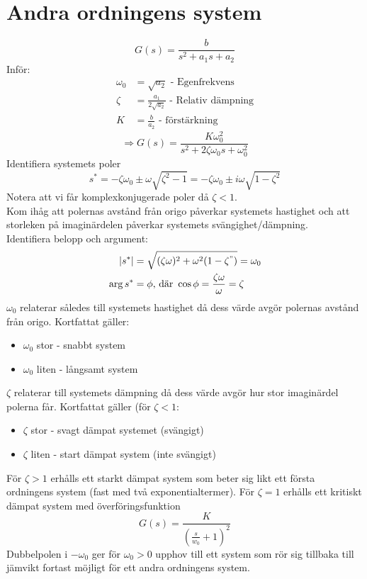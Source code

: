 \documentclass[12pt]{article}
\begin{document}
\section*{Andra ordningens system}

\begin{equation*}
  G(s) = \frac{b}{s^2 + a_1 s + a_2}
\end{equation*}
Inför: \\
\begin{align*}
  \omega_0 &= \sqrt{a_2} \text{ - Egenfrekvens} \\
  \zeta &= \frac{a_1}{2\sqrt{a_2}} \text{ - Relativ dämpning} \\
  K &= \frac{b}{a_2} \text{ - förstärkning}
\end{align*}
\begin{equation*}
  \Rightarrow G(s) = \frac{K\omega_0^2}{s^2 + 2\zeta \omega_0s + \omega_0^2}
\end{equation*}
Identifiera systemets poler
\begin{equation*}
  s^* = -\zeta\omega_0 \pm \omega\sqrt{\zeta^2-1} = -\zeta\omega_0 \pm i \omega\sqrt{1 - \zeta^2}
\end{equation*}
Notera att vi får komplexkonjugerade poler då $\zeta < 1$. \\
Kom ihåg att polernas avstånd från origo påverkar systemets hastighet och att storleken på imaginärdelen påverkar systemets svängighet/dämpning. \\

Identifiera belopp och argument: \\
\begin{align*}
|s^*| &= \sqrt{(\zeta\omega)^2 + \omega^2(1-\zeta^")} = \omega_0 \\
\arg{s^*} &= \phi \text{, där } \cos{\phi} = \frac{\zeta\omega}{\omega} = \zeta 
\end{align*}
$\omega_0$ relaterar således till systemets hastighet då dess värde avgör polernas avstånd från origo. Kortfattat gäller:
\begin{itemize}
\item $\omega_0$ stor - snabbt system
\item $\omega_0$ liten - långsamt system
\end{itemize}
$\zeta$ relaterar till systemets dämpning då dess värde avgör hur stor imaginärdel polerna får. Kortfattat gäller (för $\zeta < 1$:
\begin{itemize}
\item $\zeta$ stor - svagt dämpat systemet (svängigt)
\item $\zeta$ liten - start dämpat system (inte svängigt)
\end{itemize}
För $\zeta > 1$ erhålls ett starkt dämpat system som beter sig likt ett första ordningens system (fast med två exponentialtermer). För $\zeta = 1$ erhålls ett kritiskt dämpat system med överföringsfunktion
\[G(s) = \frac{K}{(\frac{s}{w_0} + 1)^2}\]
Dubbelpolen i $-\omega_0$ ger för $\omega_0 > 0$ upphov till ett system som rör sig tillbaka till jämvikt fortast möjligt för ett andra ordningens system.
\end{document}
